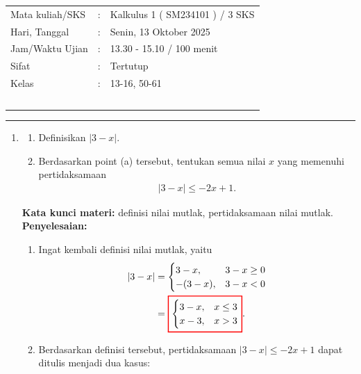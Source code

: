 \documentclass[10pt,openany,a4paper]{article}
\theoremstyle{definition}
\theoremstyle{definition}
\theoremstyle{plain}
\newenvironment{jawab}[2][tes]{%
\par\noindent\textbf{Kata kunci materi:} #1.\\
\textbf{Penyelesaian:} #2%
}{}
\begin{document}
    \begin{center}
	\begin{tabular}{lcl}
		Mata kuliah/SKS & : & Kalkulus 1 ( SM234101 ) / 3 SKS\\
		Hari, Tanggal & : & Senin, 13 Oktober 2025\\
		Jam/Waktu Ujian & : & 13.30 - 15.10 / 100 menit\\
		Sifat & : & Tertutup\\
		Kelas & : & 13-16, 50-61\\
  ~
	\end{tabular}

    \noindent\rule{\textwidth}{2.pt}
        \end{center}
        \begin{enumerate}
            \item \begin{enumerate}
                \item Definisikan $|3-x|$.
                \item Berdasarkan point (a) tersebut, tentukan semua nilai $x$ yang memenuhi pertidaksamaan
                \begin{align*}
                    |3-x|\leq -2x+1.
                \end{align*}
            \end{enumerate}
            \begin{jawab}[definisi nilai mutlak, pertidaksamaan nilai mutlak]{
                \begin{enumerate}
                    \item Ingat kembali definisi nilai mutlak, yaitu
                    \begin{align*}
                        |3-x| &= \begin{cases}
                            3-x, & 3-x \geq 0\\
                            -(3-x), & 3-x < 0
                        \end{cases} \\
                        &= \colorlet{oldcolor}{.}
        \color{red}
        \setlength{\fboxrule}{1pt} \boxed{\color{oldcolor}\begin{cases}
                            3-x, & x\leq 3\\
                            x-3, & x>3
                        \end{cases}}\color{oldcolor}.
                    \end{align*}
                    \item Berdasarkan definisi tersebut, pertidaksamaan $|3-x|\leq -2x+1$ dapat ditulis menjadi dua kasus:

\end{enumerate}}
\end{jawab}
\end{enumerate}
\end{document}
